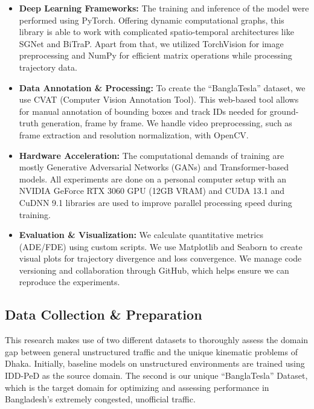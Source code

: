 \documentclass[12pt, a4paper]{article}
\begin{document}
\begin{itemize}
    \item \textbf{Deep Learning Frameworks:} The training and inference of the model were performed using PyTorch. Offering dynamic computational graphs, this library is able to work with complicated spatio-temporal architectures like SGNet and BiTraP. Apart from that, we utilized TorchVision for image preprocessing and NumPy for efficient matrix operations while processing trajectory data.
    
    \item \textbf{Data Annotation \& Processing:} To create the ``BanglaTesla'' dataset, we use CVAT (Computer Vision Annotation Tool). This web-based tool allows for manual annotation of bounding boxes and track IDs needed for ground-truth generation, frame by frame. We handle video preprocessing, such as frame extraction and resolution normalization, with OpenCV.
    
    \item \textbf{Hardware Acceleration:} The computational demands of training are mostly Generative Adversarial Networks (GANs) and Transformer-based models. All experiments are done on a personal computer setup with an NVIDIA GeForce RTX 3060 GPU (12GB VRAM) and CUDA 13.1 and CuDNN 9.1 libraries are used to improve parallel processing speed during training.
    
    \item \textbf{Evaluation \& Visualization:} We calculate quantitative metrics (ADE/FDE) using custom scripts. We use Matplotlib and Seaborn to create visual plots for trajectory divergence and loss convergence. We manage code versioning and collaboration through GitHub, which helps ensure we can reproduce the experiments.
\end{itemize}

\subsection{Data Collection \& Preparation}
This research makes use of two different datasets to thoroughly assess the domain gap between general unstructured traffic and the unique kinematic problems of Dhaka. Initially, baseline models on unstructured environments are trained using IDD-PeD as the source domain. The second is our unique ``BanglaTesla'' Dataset, which is the target domain for optimizing and assessing performance in Bangladesh's extremely congested, unofficial traffic.
\end{document}

